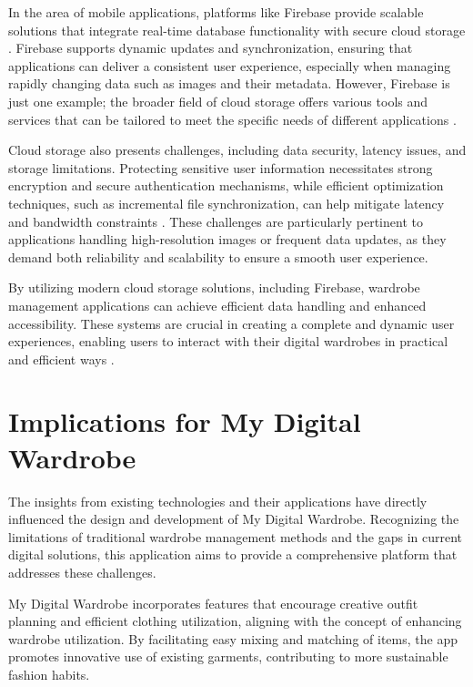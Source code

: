 In the area of mobile applications, platforms like Firebase provide scalable solutions that integrate real-time database functionality with secure cloud storage \cite{firebasecookbook}. Firebase supports dynamic updates and synchronization, ensuring that applications can deliver a consistent user experience, especially when managing rapidly changing data such as images and their metadata. However, Firebase is just one example; the broader field of cloud storage offers various tools and services that can be tailored to meet the specific needs of different applications \cite{firebase_intro}.

Cloud storage also presents challenges, including data security, latency issues, and storage limitations. Protecting sensitive user information necessitates strong encryption and secure authentication mechanisms, while efficient optimization techniques, such as incremental file synchronization, can help mitigate latency and bandwidth constraints \cite{bai2016cloud}. These challenges are particularly pertinent to applications handling high-resolution images or frequent data updates, as they demand both reliability and scalability to ensure a smooth user experience.

By utilizing modern cloud storage solutions, including Firebase, wardrobe management applications can achieve efficient data handling and enhanced accessibility. These systems are crucial in creating a complete and dynamic user experiences, enabling users to interact with their digital wardrobes in practical and efficient ways \cite{firebasecookbook}.
 
\section{Implications for My Digital Wardrobe}
The insights from existing technologies and their applications have directly influenced the design and development of My Digital Wardrobe. Recognizing the limitations of traditional wardrobe management methods and the gaps in current digital solutions, this application aims to provide a comprehensive platform that addresses these challenges.

My Digital Wardrobe incorporates features that encourage creative outfit planning and efficient clothing utilization, aligning with the concept of enhancing wardrobe utilization. By facilitating easy mixing and matching of items, the app promotes innovative use of existing garments, contributing to more sustainable fashion habits.

